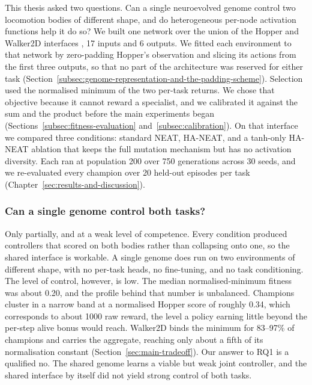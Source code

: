 This thesis asked two questions. Can a single neuroevolved genome control two locomotion bodies of different shape, and do heterogeneous per-node activation functions help it do so?
We built one network over the union of the Hopper and Walker2D interfaces \parencite{freeman_brax_2021}, 17 inputs and 6 outputs. We fitted each environment to that network by zero-padding Hopper's observation and slicing its actions from the first three outputs, so that no part of the architecture was reserved for either task (Section~\ref{subsec:genome-representation-and-the-padding-scheme}).
Selection used the normalised minimum of the two per-task returns. We chose that objective because it cannot reward a specialist, and we calibrated it against the sum and the product before the main experiments began (Sections~\ref{subsec:fitness-evaluation} and~\ref{subsec:calibration}).
On that interface we compared three conditions: standard NEAT, HA-NEAT, and a tanh-only HA-NEAT ablation that keeps the full mutation mechanism but has no activation diversity. Each ran at population 200 over 750 generations across 30 seeds, and we re-evaluated every champion over 20 held-out episodes per task (Chapter~\ref{sec:results-and-discussion}).

\subsubsection{Can a single genome control both tasks?}
Only partially, and at a weak level of competence.
Every condition produced controllers that scored on both bodies rather than collapsing onto one, so the shared interface is workable. A single genome does run on two environments of different shape, with no per-task heads, no fine-tuning, and no task conditioning.
The level of control, however, is low.
The median normalised-minimum fitness was about 0.20, and the profile behind that number is unbalanced.
Champions cluster in a narrow band at a normalised Hopper score of roughly 0.34, which corresponds to about 1000 raw reward, the level a policy earning little beyond the per-step alive bonus would reach.
Walker2D binds the minimum for 83--97\% of champions and carries the aggregate, reaching only about a fifth of its normalisation constant (Section~\ref{sec:main-tradeoff}).
Our answer to RQ1 is a qualified no. The shared genome learns a viable but weak joint controller, and the shared interface by itself did not yield strong control of both tasks.

